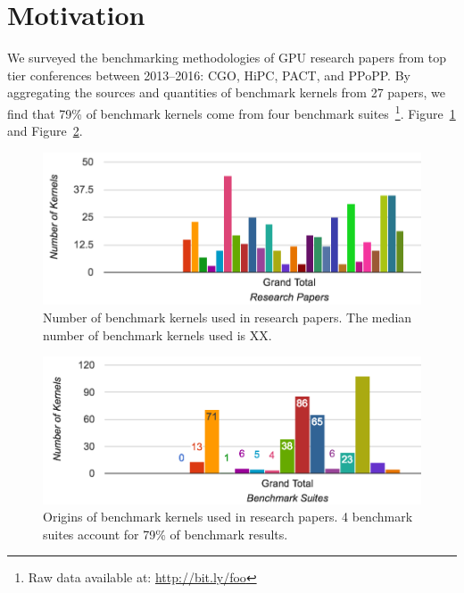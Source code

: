 \documentclass[preprint,nonatbib,10pt,nocopyrightspace]{sigplanconf}
\begin{document}
\section{Motivation}\label{sec:motivation}

We surveyed the benchmarking methodologies of GPU research papers from
top tier conferences between 2013--2016: CGO, HiPC, PACT, and
PPoPP. By aggregating the sources and quantities of benchmark kernels
from 27 papers, we find that 79\% of benchmark kernels come from four
benchmark suites~\footnote{Raw data available at:
  \url{http://bit.ly/foo}}. Figure~\ref{fig:benchmark-quantity-distribution}
and Figure~\ref{fig:benchmark-suite-distribution}.


\begin{figure}[t]
  \includegraphics[width=\columnwidth]{img/benchmark-quantitiy-distribution}
  \caption{%
    Number of benchmark kernels used in research papers. The median
    number of benchmark kernels used is XX.%
  }
  \label{fig:benchmark-quantity-distribution}
\end{figure}

\begin{figure}[t]
  \includegraphics[width=\columnwidth]{img/benchmark-suite-distribution}
  \caption{%
    Origins of benchmark kernels used in research papers. 4 benchmark
    suites account for 79\% of benchmark results.%
  }
  \label{fig:benchmark-suite-distribution}
\end{figure}
\end{document}
